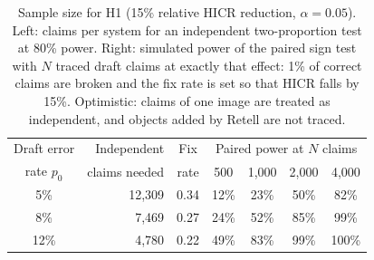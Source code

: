 \begin{table}[t]
\caption{Sample size for H1 (15\% relative HICR reduction, $\alpha=0.05$). Left: claims per system for an
independent two-proportion test at 80\% power. Right: simulated power of the paired sign test with $N$ traced
draft claims at exactly that effect: 1\% of correct claims are broken and the fix rate is set so that HICR falls
by 15\%. Optimistic: claims of one image are treated as independent, and objects added by Retell are not traced.}
\label{tab:power}
\centering\footnotesize
\begin{tabular}{@{}crc|cccc@{}}
\toprule
Draft error & Independent & Fix & \multicolumn{4}{c}{Paired power at $N$ claims} \\
rate $p_0$ & claims needed & rate & 500 & 1{,}000 & 2{,}000 & 4{,}000 \\
\midrule
5\% & 12{,}309 & 0.34 & 12\% & 23\% & 50\% & 82\% \\
8\% & 7{,}469 & 0.27 & 24\% & 52\% & 85\% & 99\% \\
12\% & 4{,}780 & 0.22 & 49\% & 83\% & 99\% & 100\% \\
\bottomrule
\end{tabular}
\end{table}

